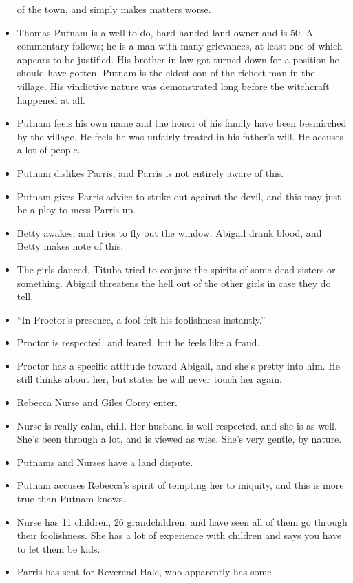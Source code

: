 \documentclass[10pt]{article}
\begin{document}
\begin{itemize}
		of the town, and simply makes matters worse.
	\item Thomas Putnam is a well-to-do, hard-handed land-owner and is
		50.  A commentary follows; he is a man with many grievances, at 
		least one of which appears to be justified.  His brother-in-law
		got turned down for a position he should have gotten.  Putnam is
		the eldest son of the richest man in the village.  His vindictive 
		nature was demonstrated long before the witchcraft happened at all.
	\item Putnam feels his own name and the honor of his family have been 
		besmirched by the village.  He feels he was unfairly treated in his
		father's will.  He accuses a lot of people.
	\item Putnam dislikes Parris, and Parris is not entirely aware of this.
	\item Putnam gives Parris advice to strike out against the devil,
		and this may just be a ploy to mess Parris up.
	\item Betty awakes, and tries to fly out the window.  Abigail drank
		blood, and Betty makes note of this.
	\item The girls danced, Tituba tried to conjure the spirits of 
		some dead sisters or something.  Abigail threatens the hell out of
		the other girls in case they do tell.
	\item ``In Proctor's presence, a fool felt his foolishness instantly.''
	\item Proctor is respected, and feared, but he feels like a fraud.
	\item Proctor has a specific attitude toward Abigail, and she's 
		pretty into him.  He still thinks about her, but states he will
		never touch her again.
	\item Rebecca Nurse and Giles Corey enter.
	\item Nurse is really calm, chill.  Her husband is well-respected,
		and she is as well.  She's been through a lot, and is viewed as
		wise.  She's very gentle, by nature.
	\item Putnams and Nurses have a land dispute.
	\item Putnam accuses Rebecca's spirit of tempting her to iniquity,
		and this is more true than Putnam knows.
	\item Nurse has 11 children, 26 grandchildren, and have seen all
		of them go through their foolishness.  She has a lot of experience
		with children and says you have to let them be kids.
	\item Parris has sent for Reverend Hale, who apparently has some

\end{itemize}
\end{document}
